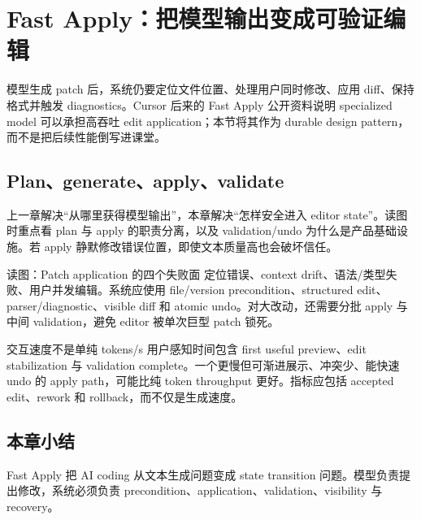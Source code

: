 \section{Fast Apply：把模型输出变成可验证编辑}

模型生成 patch 后，系统仍要定位文件位置、处理用户同时修改、应用 diff、保持格式并触发 diagnostics。Cursor 后来的 Fast Apply 公开资料说明 specialized model 可以承担高吞吐 edit application；本节将其作为 durable design pattern，而不是把后续性能倒写进课堂。

\subsection{Plan、generate、apply、validate}

上一章解决“从哪里获得模型输出”，本章解决“怎样安全进入 editor state”。读图时重点看 plan 与 apply 的职责分离，以及 validation/undo 为什么是产品基础设施。若 apply 静默修改错误位置，即使文本质量高也会破坏信任。


\begin{knowledgebox}{读图：Patch application 的四个失败面}
定位错误、context drift、语法/类型失败、用户并发编辑。系统应使用 file/version precondition、structured edit、parser/diagnostic、visible diff 和 atomic undo。对大改动，还需要分批 apply 与中间 validation，避免 editor 被单次巨型 patch 锁死。
\end{knowledgebox}

\begin{importantbox}{交互速度不是单纯 tokens/s}
用户感知时间包含 first useful preview、edit stabilization 与 validation complete。一个更慢但可渐进展示、冲突少、能快速 undo 的 apply path，可能比纯 token throughput 更好。指标应包括 accepted edit、rework 和 rollback，而不仅是生成速度。
\end{importantbox}

\subsection{本章小结}

Fast Apply 把 AI coding 从文本生成问题变成 state transition 问题。模型负责提出修改，系统必须负责 precondition、application、validation、visibility 与 recovery。

